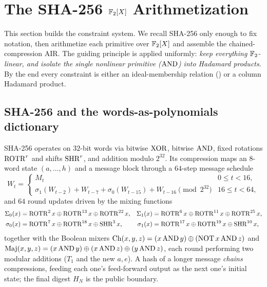 \section{The SHA-256 $\mathbb{F}_2[X]$ Arithmetization}
\label{sec:arith}

This section builds the constraint system. We recall SHA-256 only enough to fix
notation, then arithmetize each primitive over $\mathbb{F}_2[X]$ and assemble the
chained-compression AIR. The guiding principle is applied uniformly: \emph{keep
everything $\mathbb{F}_2$-linear, and isolate the single nonlinear primitive ($\operatorname{AND}$)
into Hadamard products}. By the end every constraint is either an
ideal-membership relation () or a column Hadamard product.

\subsection{SHA-256 and the words-as-polynomials dictionary}
\label{sec:sha-recap}

SHA-256 operates on $32$-bit words via bitwise $\operatorname{XOR}$, bitwise $\operatorname{AND}$, fixed
rotations $\operatorname{ROTR}^r$ and shifts $\operatorname{SHR}^r$, and addition modulo $2^{32}$. Its
compression maps an $8$-word state $(a,\dots,h)$ and a message block through a
$64$-step message schedule
\begin{equation}
  \label{eq:msched}
  W_t = \begin{cases}
    M_t & 0 \le t < 16,\\
    \sigma_1(W_{t-2}) + W_{t-7} + \sigma_0(W_{t-15}) + W_{t-16} \pmod{2^{32}}
    & 16 \le t < 64,
  \end{cases}
\end{equation}
and $64$ round updates driven by the mixing functions
\begin{align*}
  \Sigma_0(x) &= \operatorname{ROTR}^{2}x \oplus \operatorname{ROTR}^{13}x \oplus \operatorname{ROTR}^{22}x, &
  \Sigma_1(x) &= \operatorname{ROTR}^{6}x \oplus \operatorname{ROTR}^{11}x \oplus \operatorname{ROTR}^{25}x,\\
  \sigma_0(x) &= \operatorname{ROTR}^{7}x \oplus \operatorname{ROTR}^{18}x \oplus \operatorname{SHR}^{3}x, &
  \sigma_1(x) &= \operatorname{ROTR}^{17}x \oplus \operatorname{ROTR}^{19}x \oplus \operatorname{SHR}^{10}x,
\end{align*}
together with the Boolean mixers
$\operatorname{Ch}(x,y,z) = (x\operatorname{AND} y)\oplus(\operatorname{NOT} x\operatorname{AND} z)$ and
$\operatorname{Maj}(x,y,z) = (x\operatorname{AND} y)\oplus(x\operatorname{AND} z)\oplus(y\operatorname{AND} z)$, each round performing
two modular additions ($T_1$ and the new $a,e$). A hash of a longer message
\emph{chains} compressions, feeding each one's feed-forward output as the next
one's initial state; the final digest $H_N$ is the public boundary.

